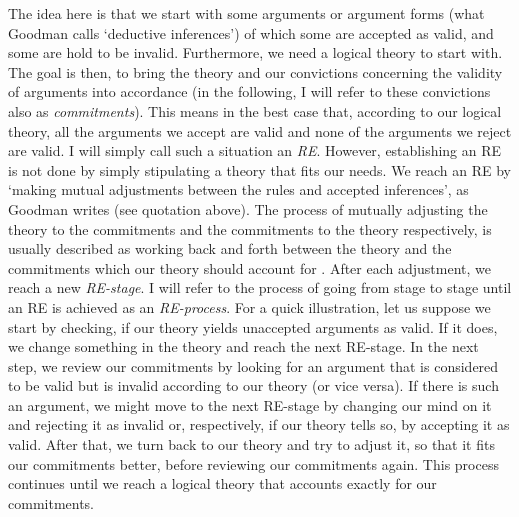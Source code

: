 \documentclass{article}
\begin{document}
The idea here is that we start with some arguments or argument forms (what Goodman calls `deductive inferences') of which some are accepted as valid, and some are hold to be invalid. Furthermore, we need a logical theory to start with. The goal is then, to bring the theory and our convictions concerning the validity of arguments into accordance (in the following, I will refer to these convictions also as \textit{commitments}). This means in the best case that, according to our logical theory, all the arguments we accept are valid and none of the arguments we reject are valid. I will simply call such a situation an \textit{RE}. However, establishing an RE is not done by simply stipulating a theory that fits our needs. We reach an RE by `making mutual adjustments between the rules and accepted inferences', as Goodman writes (see quotation above). The process of mutually adjusting the theory to the commitments and the commitments to the theory respectively, is usually described as working back and forth between the theory and the commitments which our theory should account for \cite{sep-reflective-equilibrium}. After each adjustment, we reach a new \textit{RE-stage}. I will refer to the process of going from stage to stage until an RE is achieved as an \textit{RE-process}. For a quick illustration, let us suppose we start by checking, if our theory yields unaccepted arguments as valid. If it does, we change something in the theory and reach the next RE-stage. In the next step, we review our commitments by looking for an argument that is considered to be valid but is invalid according to our theory (or vice versa). If there is such an argument, we might move to the next RE-stage by changing our mind on it and rejecting it as invalid or, respectively, if our theory tells so, by accepting it as valid. After that, we turn back to our theory and try to adjust it, so that it fits our commitments better, before reviewing our commitments again. This process continues until we reach a logical theory that accounts exactly for our commitments.
\end{document}
